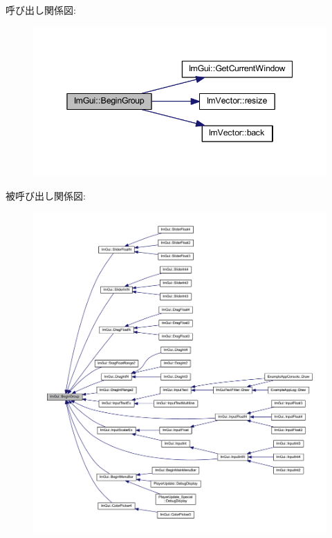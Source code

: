 呼び出し関係図\+:\nopagebreak
\begin{figure}[H]
\begin{center}
\leavevmode
\includegraphics[width=345pt]{namespace_im_gui_a42407e196b7ed2a8755bff28aae9805f_cgraph}
\end{center}
\end{figure}
被呼び出し関係図\+:\nopagebreak
\begin{figure}[H]
\begin{center}
\leavevmode
\includegraphics[width=350pt]{namespace_im_gui_a42407e196b7ed2a8755bff28aae9805f_icgraph}
\end{center}
\end{figure}
\mbox{\label{namespace_im_gui_a55cb9cfb9865204ac6fb21c965784f78}} 
